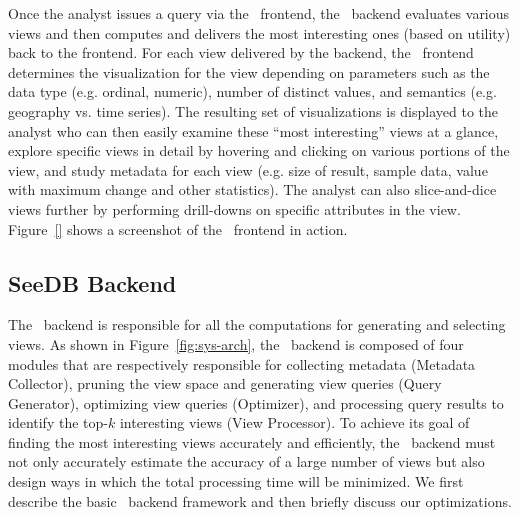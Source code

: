 Once the analyst issues a query via the \SeeDB\ frontend, the \SeeDB\ backend
evaluates various views and then 
computes and delivers the most interesting ones (based on utility) back to the frontend.
For each view delivered by the backend, the \SeeDB\ frontend determines the visualization
for the view depending on parameters such as the data
type (e.g. ordinal, numeric), number of distinct values, and semantics (e.g.
geography vs. time series).
The resulting set of visualizations is displayed to the analyst who can then
easily examine these ``most interesting'' views at a glance, explore specific views in
detail by hovering and clicking on various portions of the view, 
and study metadata for each view (e.g. size of result, sample data, value with
maximum change and other statistics). 
The analyst can also slice-and-dice views further by performing drill-downs on
specific attributes in the view. 
Figure~\ref{}  shows a screenshot of the \SeeDB\ frontend in action.

\subsection{SeeDB Backend}
\label{subsec:seedb_backend}

The \SeeDB\ backend is responsible for all the computations for 
generating and selecting views. 
As shown in Figure~\ref{fig:sys-arch}, the \SeeDB\ backend is composed of four
modules that are respectively responsible for collecting metadata (Metadata Collector), pruning
the view space and generating view queries (Query Generator), optimizing view
queries (Optimizer), and processing query results to identify the top-$k$
interesting views (View Processor). 
To achieve its goal of finding the most
interesting views accurately and efficiently, the \SeeDB\ backend must not only accurately
estimate the accuracy of a large number of views but also design ways in which
the total processing time will be minimized.
We first describe the basic \SeeDB\ backend framework and then briefly discuss our optimizations.


